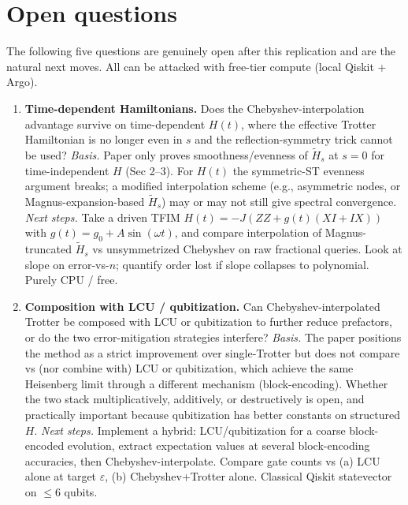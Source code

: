 \section{Open questions}

The following five questions are genuinely open after this replication
and are the natural next moves. All can be attacked with free-tier
compute (local Qiskit + Argo).

\begin{enumerate}

\item \textbf{Time-dependent Hamiltonians.}
Does the Chebyshev-interpolation advantage survive on time-dependent
$H(t)$, where the effective Trotter Hamiltonian is no longer even in $s$
and the reflection-symmetry trick cannot be used?
\emph{Basis.} Paper only proves smoothness/evenness of $\tilde H_s$ at
$s=0$ for time-independent $H$ (Sec 2--3). For $H(t)$ the symmetric-ST
evenness argument breaks; a modified interpolation scheme (e.g.,
asymmetric nodes, or Magnus-expansion-based $\tilde H_s$) may or may
not still give spectral convergence.
\emph{Next steps.} Take a driven TFIM
$H(t) = -J(ZZ + g(t)(XI+IX))$ with $g(t) = g_0 + A\sin(\omega t)$, and
compare interpolation of Magnus-truncated $\tilde H_s$ vs unsymmetrized
Chebyshev on raw fractional queries. Look at slope on error-vs-$n$;
quantify order lost if slope collapses to polynomial. Purely CPU / free.

\item \textbf{Composition with LCU / qubitization.}
Can Chebyshev-interpolated Trotter be composed with LCU or qubitization
to further reduce prefactors, or do the two error-mitigation strategies
interfere?
\emph{Basis.} The paper positions the method as a strict improvement
over single-Trotter but does not compare vs (nor combine with) LCU or
qubitization, which achieve the same Heisenberg limit through a
different mechanism (block-encoding). Whether the two stack
multiplicatively, additively, or destructively is open, and practically
important because qubitization has better constants on structured $H$.
\emph{Next steps.} Implement a hybrid: LCU/qubitization for a coarse
block-encoded evolution, extract expectation values at several
block-encoding accuracies, then Chebyshev-interpolate. Compare gate
counts vs (a) LCU alone at target $\varepsilon$, (b) Chebyshev+Trotter
alone. Classical Qiskit statevector on $\le 6$ qubits.


\end{enumerate}
